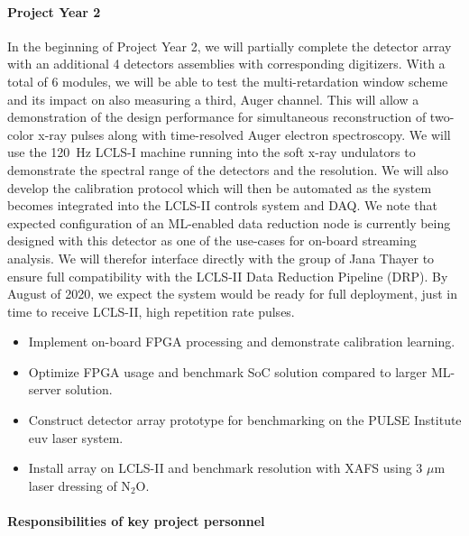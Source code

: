 \paragraph*{Project Year 2}
In the beginning of Project Year 2, we will partially complete the detector array with an additional 4 detectors assemblies with corresponding digitizers.
With a total of 6 modules, we will be able to test the multi-retardation window scheme and its impact on also measuring a third, Auger channel.
This will allow a demonstration of the design performance for simultaneous reconstruction of two-color x-ray pulses along with time-resolved Auger electron spectroscopy.
We will use the 120~Hz LCLS-I machine running into the soft x-ray undulators to demonstrate the spectral range of the detectors and the resolution.  
We will also develop the calibration protocol which will then be automated as the system becomes integrated into the LCLS-II controls system and DAQ.  
We note that expected configuration of an ML-enabled data reduction node is currently being designed with this detector as one of the use-cases for on-board streaming analysis.  
We will therefor interface directly with the group of Jana Thayer to ensure full compatibility with the LCLS-II Data Reduction Pipeline (DRP).  
By August of 2020, we expect the system would be ready for full deployment, just in time to receive LCLS-II, high repetition rate pulses.
\begin{itemize}
\item Implement on-board FPGA processing and demonstrate calibration learning.
\item Optimize FPGA usage and benchmark SoC solution compared to larger ML-server solution.
\item Construct detector array prototype for benchmarking on the PULSE Institute euv laser system.
\item Install array on LCLS-II and benchmark resolution with XAFS using 3 $\mu$m laser dressing of N$_2$O.
\end{itemize}

\paragraph*{Responsibilities of key project personnel}

